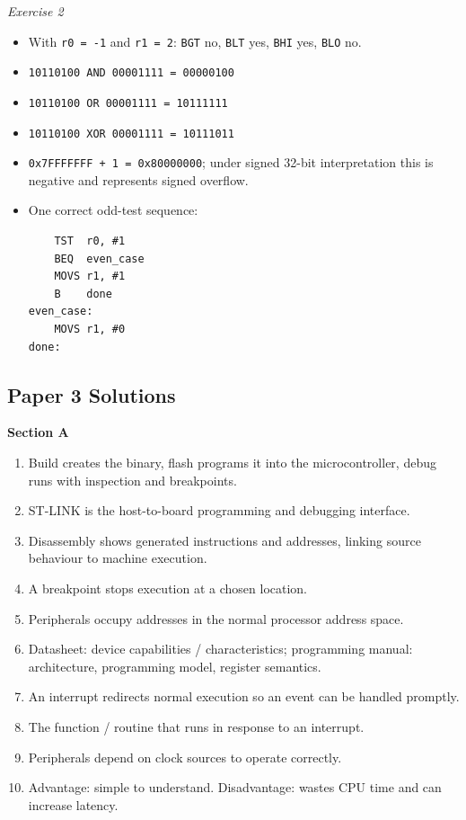\documentclass[11pt,a4paper]{article}
\begin{document}
\textit{Exercise 2}
\begin{itemize}[leftmargin=1.5em]
\item With \texttt{r0 = -1} and \texttt{r1 = 2}: \texttt{BGT} no, \texttt{BLT} yes, \texttt{BHI} yes, \texttt{BLO} no.
\item \texttt{10110100 AND 00001111 = 00000100}
\item \texttt{10110100 OR 00001111 = 10111111}
\item \texttt{10110100 XOR 00001111 = 10111011}
\item \texttt{0x7FFFFFFF + 1 = 0x80000000}; under signed 32-bit interpretation this is negative and represents signed overflow.
\item One correct odd-test sequence:
\begin{verbatim}
    TST  r0, #1
    BEQ  even_case
    MOVS r1, #1
    B    done
even_case:
    MOVS r1, #0
done:
\end{verbatim}
\end{itemize}

\subsection*{Paper 3 Solutions}
\textbf{Section A}
\begin{enumerate}
\item Build creates the binary, flash programs it into the microcontroller, debug runs with inspection and breakpoints.
\item ST-LINK is the host-to-board programming and debugging interface.
\item Disassembly shows generated instructions and addresses, linking source behaviour to machine execution.
\item A breakpoint stops execution at a chosen location.
\item Peripherals occupy addresses in the normal processor address space.
\item Datasheet: device capabilities / characteristics; programming manual: architecture, programming model, register semantics.
\item An interrupt redirects normal execution so an event can be handled promptly.
\item The function / routine that runs in response to an interrupt.
\item Peripherals depend on clock sources to operate correctly.
\item Advantage: simple to understand. Disadvantage: wastes CPU time and can increase latency.
\end{enumerate}
\end{document}
